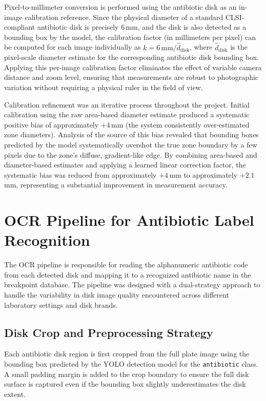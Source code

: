 Pixel-to-millimeter conversion is performed using the antibiotic disk as an in-image
calibration reference. Since the physical diameter of a standard CLSI-compliant antibiotic
disk is precisely 6\,mm, and the disk is also detected as a bounding box by the model,
the calibration factor (in millimeters per pixel) can be computed for each image individually
as $k = 6\,\mathrm{mm} / \hat{d}_{\mathrm{disk}}$, where $\hat{d}_{\mathrm{disk}}$ is the
pixel-scale diameter estimate for the corresponding antibiotic disk bounding box. Applying
this per-image calibration factor eliminates the effect of variable camera distance and zoom
level, ensuring that measurements are robust to photographic variation without requiring a
physical ruler in the field of view.

Calibration refinement was an iterative process throughout the project. Initial calibration
using the raw area-based diameter estimate produced a systematic positive bias of approximately
$+4$\,mm (the system consistently over-estimated zone diameters). Analysis of the source of
this bias revealed that bounding boxes predicted by the model systematically overshot the
true zone boundary by a few pixels due to the zone's diffuse, gradient-like edge. By combining
area-based and diameter-based estimates and applying a learned linear correction factor, the
systematic bias was reduced from approximately $+4$\,mm to approximately $+2.1$\,mm,
representing a substantial improvement in measurement accuracy.

\section{OCR Pipeline for Antibiotic Label Recognition}

The OCR pipeline is responsible for reading the alphanumeric antibiotic code from each
detected disk and mapping it to a recognized antibiotic name in the breakpoint database.
The pipeline was designed with a dual-strategy approach to handle the variability in disk
image quality encountered across different laboratory settings and disk brands.

\subsection{Disk Crop and Preprocessing Strategy}

Each antibiotic disk region is first cropped from the full plate image using the bounding box
predicted by the YOLO detection model for the \texttt{antibiotic} class. A small padding
margin is added to the crop boundary to ensure the full disk surface is captured even if the
bounding box slightly underestimates the disk extent.


